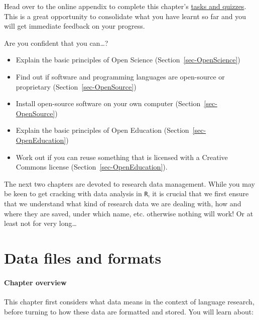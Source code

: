 \documentclass[
  letterpaper,
  DIV=11,
  numbers=noendperiod]{scrreprt}
\providecommand{\tightlist}{%
  \setlength{\itemsep}{0pt}\setlength{\parskip}{0pt}}
\begin{document}
Head over to the online appendix to complete this chapter's
\href{https://elenlefoll.github.io/RstatsTextbook/quizzes/1_quiz.html}{tasks
and quizzes}. This is a great opportunity to consolidate what you have
learnt so far and you will get immediate feedback on your progress.

Are you confident that you can\ldots?

\begin{itemize}
\tightlist
\item[$\square$]
  Explain the basic principles of Open Science
  (Section~\ref{sec-OpenScience})
\item[$\square$]
  Find out if software and programming languages are open-source or
  proprietary (Section~\ref{sec-OpenSource})
\item[$\square$]
  Install open-source software on your own computer
  (Section~\ref{sec-OpenSource})
\item[$\square$]
  Explain the basic principles of Open Education
  (Section~\ref{sec-OpenEducation})
\item[$\square$]
  Work out if you can reuse something that is licensed with a Creative
  Commons license (Section~\ref{sec-OpenEducation}).
\end{itemize}

The next two chapters are devoted to research data management. While you
may be keen to get cracking with data analysis in \texttt{R}, it is
crucial that we first ensure that we understand what kind of research
data we are dealing with, how and where they are saved, under which
name, etc. otherwise nothing will work! Or at least not for very
long\ldots{}


\chapter{Data files and formats}\label{sec-DataFormats}

\subsubsection*{\texorpdfstring{\textbf{Chapter
overview}}{Chapter overview}}\label{chapter-overview-1}

This chapter first considers what data means in the context of language
research, before turning to how these data are formatted and stored. You
will learn about:
\end{document}
